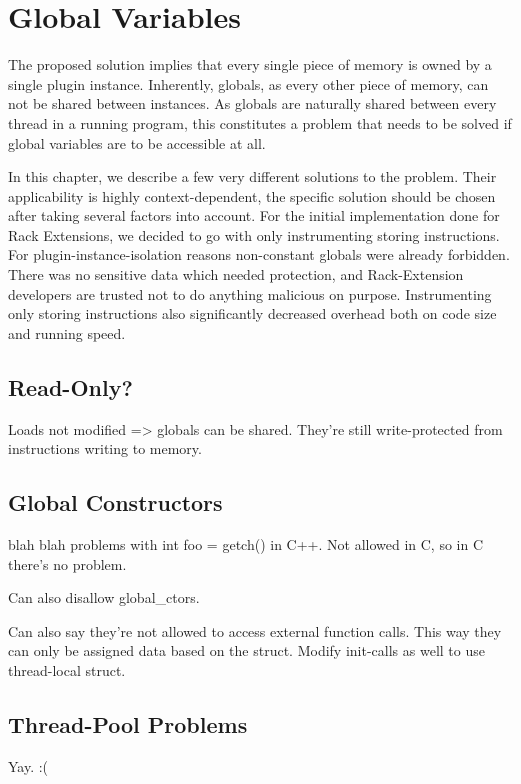 \chapter {Global Variables}

The proposed solution implies that every single piece of memory is owned by a
single plugin instance. Inherently, globals, as every other piece of memory, can
not be shared between instances. As globals are naturally shared between every
thread in a running program, this constitutes a problem that needs to be solved
if global variables are to be accessible at all.

In this chapter, we describe a few very different solutions to the problem.
Their applicability is highly context-dependent, the specific solution should be
chosen after taking several factors into account. For the initial implementation
done for Rack Extensions, we decided to go with only instrumenting storing
instructions. For plugin-instance-isolation reasons non-constant globals were
already forbidden. There was no sensitive data which needed protection, and
Rack-Extension developers are trusted not to do anything malicious on purpose.
Instrumenting only storing instructions also significantly decreased overhead
both on code size and running speed.


\section {Read-Only?}

Loads not modified => globals can be shared. They're still write-protected from
instructions writing to memory.


\section {Global Constructors}

blah blah problems with int foo = getch() in C++. Not allowed in C, so in C
there's no problem.

Can also disallow global\_ctors.

Can also say they're not allowed to access external function calls. This way
they can only be assigned data based on the struct. Modify init-calls as well
to use thread-local struct.


\section {Thread-Pool Problems}

Yay. :(

